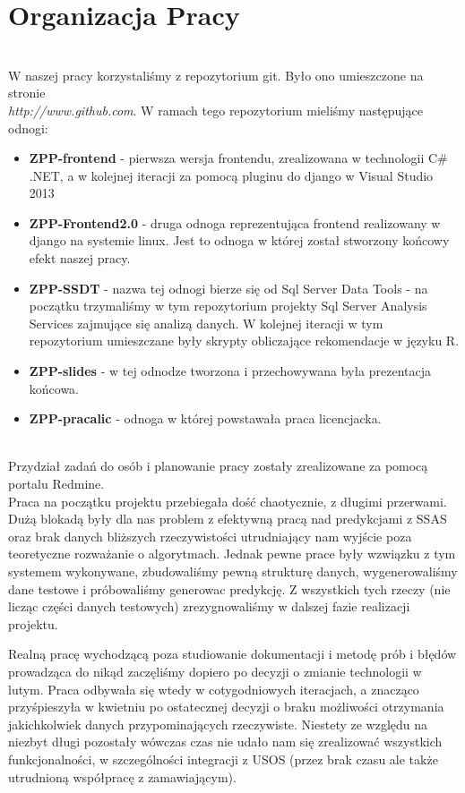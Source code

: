 \documentclass[licencjacka]{pracamgr}
\begin{document}
\section{Organizacja Pracy} ~\\


W naszej pracy korzystaliśmy z repozytorium git. Było ono umieszczone na stronie \\ \textit{http://www.github.com}. W ramach tego repozytorium mieliśmy następujące odnogi:
\begin{itemize}
    \item \textbf{ZPP-frontend} - pierwsza wersja frontendu, zrealizowana w technologii C\# .NET, a w kolejnej iteracji za pomocą pluginu do django w Visual Studio 2013
    \item \textbf{ZPP-Frontend2.0} - druga odnoga reprezentująca frontend realizowany w django na systemie linux. Jest to odnoga w której został stworzony końcowy efekt naszej pracy.
    \item \textbf{ZPP-SSDT} - nazwa tej odnogi bierze się od Sql Server Data Tools - na początku trzymaliśmy w tym repozytorium projekty Sql Server Analysis Services zajmujące się analizą danych. W kolejnej iteracji w tym repozytorium umieszczane były skrypty obliczające rekomendacje w języku R.
    \item \textbf{ZPP-slides} - w tej odnodze tworzona i przechowywana była prezentacja końcowa.
    \item \textbf{ZPP-pracalic} - odnoga w której powstawała praca licencjacka.
\end{itemize} ~\\

Przydział zadań do osób i planowanie pracy zostały zrealizowane za pomocą portalu Redmine. \\

Praca na początku projektu przebiegała dość chaotycznie, z długimi przerwami. Dużą blokadą były dla nas problem z efektywną pracą nad predykcjami z SSAS oraz brak danych bliższych rzeczywistości utrudniający nam wyjście poza teoretyczne rozważanie o algorytmach. Jednak pewne prace były wzwiązku z tym systemem wykonywane, zbudowaliśmy pewną strukturę danych, wygenerowaliśmy dane testowe i próbowaliśmy generowac predykcję. Z wszystkich tych rzeczy (nie licząc części danych testowych) zrezygnowaliśmy w dalszej fazie realizacji projektu.

Realną pracę wychodzącą poza studiowanie dokumentacji i metodę prób i błędów prowadząca do nikąd zaczęliśmy dopiero po decyzji o zmianie technologii w lutym. Praca odbywała się wtedy w cotygodniowych iteracjach, a znacząco przyśpieszyła w kwietniu po ostatecznej decyzji o braku możliwości otrzymania jakichkolwiek danych przypominających rzeczywiste. Niestety ze względu na niezbyt długi pozostały wówczas czas nie udało nam się zrealizować wszystkich funkcjonalności, w szczególności integracji z USOS (przez brak czasu ale także utrudnioną współpracę z zamawiającym).
\end{document}
